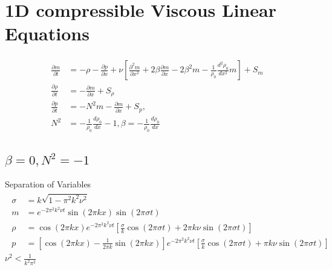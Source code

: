\documentclass{article}
\begin{document}
\section{1D compressible Viscous Linear Equations}
\begin{align} \begin{split}
	\frac{\partial m}{\partial t} &= -\rho -\frac{\partial p}{\partial x} + \nu \left[\frac{\partial^2 m}{\partial x^2} + 2 \beta \frac{\partial m}{\partial x} - 2 \beta^2 m - \frac{1}{\rho_0} \frac{ d^2 \rho_0}{dx^2} m\right] + S_m \\
	\frac{\partial \rho}{\partial t} &= - \frac{\partial m}{\partial x} + S_\rho \\
	\frac{\partial p}{\partial t} &= - N^2 m - \frac{\partial m}{\partial x} +S_p, \\
	N^2 &= - \frac{1}{\rho_0}\frac{d \rho_0}{dx} - 1, \beta = - \frac{1}{\rho_0}\frac{d \rho_0}{dx}
\end{split} \end{align}
\subsection{$\beta =0, N^2 = -1$}
Separation of Variables
\begin{align} \begin{split}
	\sigma &= k \sqrt{1-\pi^2k^2 \nu^2} \\
	m &= e^{-2\pi^2k^2\nu t} \sin(2\pi k x) \sin(2 \pi \sigma t) \\
	\rho &= \cos(2\pi k x) e^{-2\pi^2k^2\nu t} \left[\frac{\sigma}{k} \cos(2\pi \sigma t) + 2 \pi k \nu \sin(2\pi \sigma t)\right] \\
	p &=   \left[\cos(2\pi k x) -\frac{1}{2\pi k} \sin(2\pi k x)\right] e^{-2\pi^2k^2\nu t} \left[\frac{\sigma}{k} \cos(2\pi \sigma t) + \pi k \nu \sin(2\pi \sigma t)\right]
\end{split} \end{align}
$\nu^2 < \frac{1}{k^2 \pi^2}$
\end{document}
